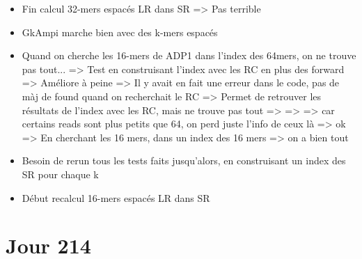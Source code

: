 \documentclass[12pt]{report}
\begin{document}
\begin{itemize}
	\item Fin calcul 32-mers espacés LR dans SR => Pas terrible
	
	\item GkAmpi marche bien avec des k-mers espacés
	
	\item Quand on cherche les 16-mers de ADP1 dans l'index des 64mers, on ne trouve pas tout...
			=> Test en construisant l'index avec les RC en plus des forward => Améliore à peine
			=> Il y avait en fait une erreur dans le code, pas de màj de found quand on recherchait le RC
			=> Permet de retrouver les résultats de l'index avec les RC, mais ne trouve pas tout
			=> => => car certains reads sont plus petits que 64, on perd juste l'info de ceux là => ok 
			=> En cherchant les 16 mers, dans un index des 16 mers => on a bien tout
			
	\item Besoin de rerun tous les tests faits jusqu'alors, en construisant un index des SR pour chaque k
	
	\item Début recalcul 16-mers espacés LR dans SR
\end{itemize}

\section{Jour 214}
\end{document}
